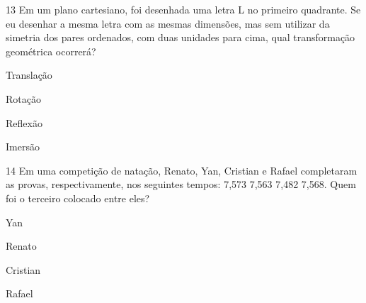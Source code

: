 \num{13} Em um plano cartesiano, foi desenhada uma letra L no primeiro
quadrante. Se eu desenhar a mesma letra com as mesmas dimensões, mas sem
utilizar da simetria dos pares ordenados, com duas unidades para cima,
qual transformação geométrica ocorrerá?

\begin{escolha}
\item Translação
\item Rotação
\item Reflexão
\item Imersão
\end{escolha}




\num{14} Em uma competição de natação, Renato, Yan, Cristian e Rafael
completaram as provas, respectivamente, nos seguintes tempos: 7,573
7,563 7,482 7,568. Quem foi o terceiro colocado entre eles?

\begin{escolha}
\item Yan
\item Renato
\item Cristian
\item Rafael
\end{escolha}




